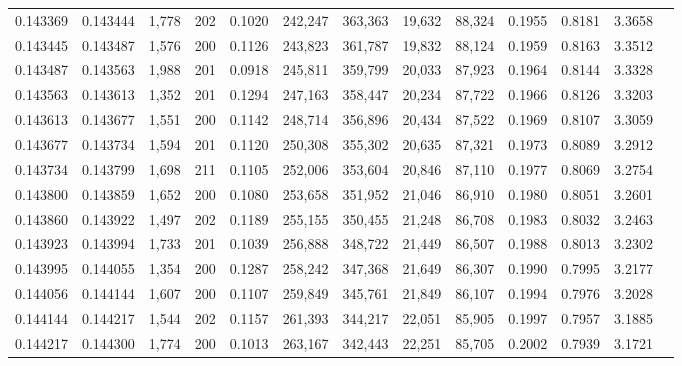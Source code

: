 \begin{tabular}{rrrrrrrrrrrrr}
0.143369 & 0.143444 & 1,778 & 202 &                                     0.1020 & 242,247 & 363,363 &  19,632 &  88,324 & 0.1955 & 0.8181 & 3.3658 \\
0.143445 & 0.143487 & 1,576 & 200 &                                     0.1126 & 243,823 & 361,787 &  19,832 &  88,124 & 0.1959 & 0.8163 & 3.3512 \\
0.143487 & 0.143563 & 1,988 & 201 &                                     0.0918 & 245,811 & 359,799 &  20,033 &  87,923 & 0.1964 & 0.8144 & 3.3328 \\
0.143563 & 0.143613 & 1,352 & 201 &                                     0.1294 & 247,163 & 358,447 &  20,234 &  87,722 & 0.1966 & 0.8126 & 3.3203 \\
0.143613 & 0.143677 & 1,551 & 200 &                                     0.1142 & 248,714 & 356,896 &  20,434 &  87,522 & 0.1969 & 0.8107 & 3.3059 \\
0.143677 & 0.143734 & 1,594 & 201 &                                     0.1120 & 250,308 & 355,302 &  20,635 &  87,321 & 0.1973 & 0.8089 & 3.2912 \\
0.143734 & 0.143799 & 1,698 & 211 &                                     0.1105 & 252,006 & 353,604 &  20,846 &  87,110 & 0.1977 & 0.8069 & 3.2754 \\
0.143800 & 0.143859 & 1,652 & 200 &                                     0.1080 & 253,658 & 351,952 &  21,046 &  86,910 & 0.1980 & 0.8051 & 3.2601 \\
0.143860 & 0.143922 & 1,497 & 202 &                                     0.1189 & 255,155 & 350,455 &  21,248 &  86,708 & 0.1983 & 0.8032 & 3.2463 \\
0.143923 & 0.143994 & 1,733 & 201 &                                     0.1039 & 256,888 & 348,722 &  21,449 &  86,507 & 0.1988 & 0.8013 & 3.2302 \\
0.143995 & 0.144055 & 1,354 & 200 &                                     0.1287 & 258,242 & 347,368 &  21,649 &  86,307 & 0.1990 & 0.7995 & 3.2177 \\
0.144056 & 0.144144 & 1,607 & 200 &                                     0.1107 & 259,849 & 345,761 &  21,849 &  86,107 & 0.1994 & 0.7976 & 3.2028 \\
0.144144 & 0.144217 & 1,544 & 202 &                                     0.1157 & 261,393 & 344,217 &  22,051 &  85,905 & 0.1997 & 0.7957 & 3.1885 \\
0.144217 & 0.144300 & 1,774 & 200 &                                     0.1013 & 263,167 & 342,443 &  22,251 &  85,705 & 0.2002 & 0.7939 & 3.1721 \\

\end{tabular}
